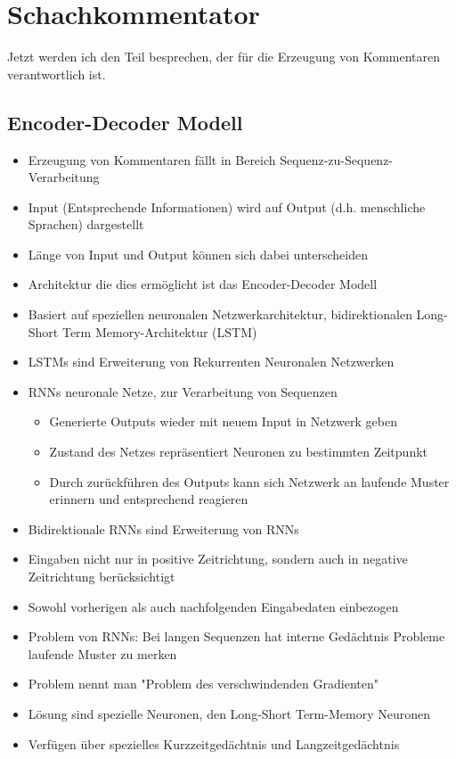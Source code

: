 \section{Schachkommentator}

Jetzt werden ich den Teil besprechen, der für die Erzeugung von Kommentaren verantwortlich ist.

\subsection{Encoder-Decoder Modell}

\begin{itemize}[leftmargin=*]
\item Erzeugung von Kommentaren fällt in Bereich Sequenz-zu-Sequenz-Verarbeitung
\item Input (Entsprechende Informationen) wird auf Output (d.h. menschliche Sprachen) dargestellt
\item Länge von Input und Output können sich dabei unterscheiden
\item Architektur die dies ermöglicht ist das Encoder-Decoder Modell
\item Basiert auf speziellen neuronalen Netzwerkarchitektur, bidirektionalen Long-Short Term Memory-Architektur (LSTM)
\end{itemize}

\newpage

\begin{itemize}[leftmargin=*]
\item LSTMs sind Erweiterung von Rekurrenten Neuronalen Netzwerken
\item RNNs neuronale Netze, zur Verarbeitung von Sequenzen
\begin{itemize}[leftmargin=*]
\item Generierte Outputs wieder mit neuem Input in Netzwerk geben
\item Zustand des Netzes repräsentiert Neuronen zu bestimmten Zeitpunkt
\item Durch zurückführen des Outputs kann sich Netzwerk an laufende Muster erinnern und entsprechend reagieren
\end{itemize}
\item Bidirektionale RNNs sind Erweiterung von RNNs
\item Eingaben nicht nur in positive Zeitrichtung, sondern auch in negative Zeitrichtung berücksichtigt
\item Sowohl vorherigen als auch nachfolgenden Eingabedaten einbezogen
\item Problem von RNNs: Bei langen Sequenzen hat interne Gedächtnis Probleme laufende Muster zu merken
\item Problem nennt man "Problem des verschwindenden Gradienten"
\item Lösung sind spezielle Neuronen, den Long-Short Term-Memory Neuronen
\item Verfügen über spezielles Kurzzeitgedächtnis und Langzeitgedächtnis
\end{itemize}

